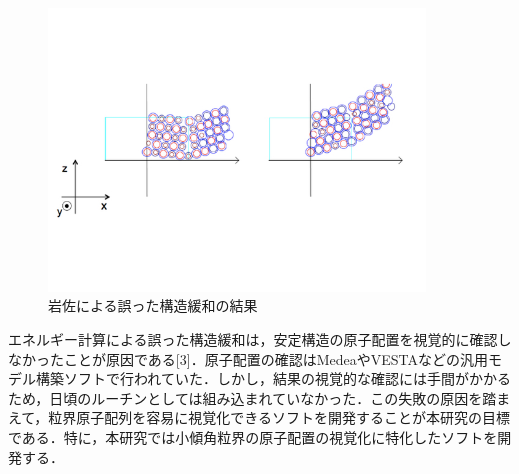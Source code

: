 \begin{figure}[htbp]\begin{center}
\includegraphics[width=10cm,bb= 0 0 737 553]{../figs/./boundary_narita.004.jpeg}
\caption{岩佐による誤った構造緩和の結果}
\label{default}\end{center}\end{figure}
エネルギー計算による誤った構造緩和は，安定構造の原子配置を視覚的に確認しなかったことが原因である[3]．原子配置の確認はMedeaやVESTAなどの汎用モデル構築ソフトで行われていた．しかし，結果の視覚的な確認には手間がかかるため，日頃のルーチンとしては組み込まれていなかった．この失敗の原因を踏まえて，粒界原子配列を容易に視覚化できるソフトを開発することが本研究の目標である．特に，本研究では小傾角粒界の原子配置の視覚化に特化したソフトを開発する．

